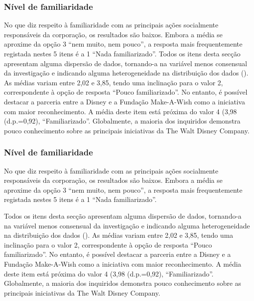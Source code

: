 \documentclass[portuguese]{textolivre}
\begin{document}
\subsubsection{Nível de familiaridade}\label{sec-listas}
No que diz respeito à familiaridade com as principais ações socialmente responsáveis da corporação, os resultados são baixos. Embora a média se aproxime da opção 3 “nem muito, nem pouco”, a resposta mais frequentemente registada nestes 5 itens é a 1 “Nada familiarizado”. 
Todos os itens desta secção apresentam alguma dispersão de dados, tornando-a na variável menos consensual da investigação e indicando alguma heterogeneidade na distribuição dos dados (). As médias variam entre 2,02 e 3,85, tendo uma inclinação para o valor 2, correspondente à opção de resposta “Pouco familiarizado”. No entanto, é possível destacar a parceria entre a Disney e a Fundação Make-A-Wish como a iniciativa com maior reconhecimento. A média deste item está próxima do valor 4 (3,98 (d.p.=0,92), “Familiarizado”. Globalmente, a maioria dos inquiridos demonstra pouco conhecimento sobre as principais iniciativas da The Walt Disney Company. 


\subsubsection{Nível de familiaridade}\label{sec-figuras-tabelas}
No que diz respeito à familiaridade com as principais ações socialmente responsáveis da corporação, os resultados são baixos. Embora a média se aproxime da opção 3 “nem muito, nem pouco”, a resposta mais frequentemente registada nestes 5 itens é a 1 “Nada familiarizado”. 

Todos os itens desta secção apresentam alguma dispersão de dados, tornando-a na variável menos consensual da investigação e indicando alguma heterogeneidade na distribuição dos dados (). As médias variam entre 2,02 e 3,85, tendo uma inclinação para o valor 2, correspondente à opção de resposta “Pouco familiarizado”. No entanto, é possível destacar a parceria entre a Disney e a Fundação Make-A-Wish como a iniciativa com maior reconhecimento. A média deste item está próxima do valor 4 (3,98 (d.p.=0,92), “Familiarizado”. Globalmente, a maioria dos inquiridos demonstra pouco conhecimento sobre as principais iniciativas da The Walt Disney Company. 
\end{document}
